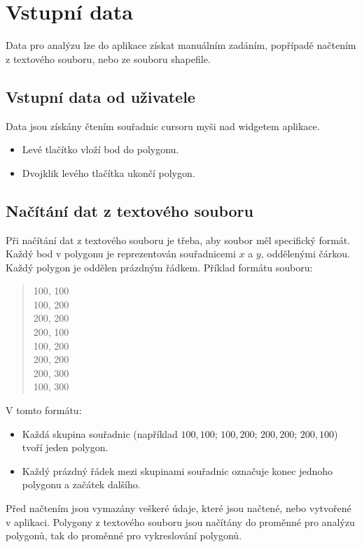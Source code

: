 \section{Vstupní data}
Data pro analýzu lze do aplikace získat manuálním zadáním, popřípadě načtením z textového souboru, nebo ze souboru shapefile.
\subsection{Vstupní data od uživatele}
Data jsou získány čtením souřadnic cursoru myši nad widgetem
aplikace.
\begin{itemize}
    \item Levé tlačítko vloží bod do polygonu.
    \item Dvojklik levého tlačítka ukončí polygon.
\end{itemize}

\subsection{Načítání dat z textového souboru}
Při načítání dat z textového souboru je třeba, aby soubor měl specifický formát. Každý bod v polygonu je reprezentován souřadnicemi \( x \) a \( y \), oddělenými čárkou. Každý polygon je oddělen prázdným řádkem. Příklad formátu souboru:

\begin{quote}
100, 100 \\
100, 200 \\
200, 200 \\
200, 100 \\

100, 200 \\
200, 200 \\
200, 300 \\
100, 300 \\

\end{quote}

\noindent V tomto formátu:
\begin{itemize}
    \item Každá skupina souřadnic (například \(100,100\); \(100,200\); \(200,200\); \(200,100\)) tvoří jeden polygon.
    \item Každý prázdný řádek mezi skupinami souřadnic označuje konec jednoho polygonu a začátek dalšího.
\end{itemize}
Před načtením jsou vymazány veškeré údaje, které jsou načtené, nebo vytvořené v aplikaci. Polygony z textového souboru jsou načítány do proměnné pro analýzu polygonů, tak do proměnné pro vykreslování polygonů.


